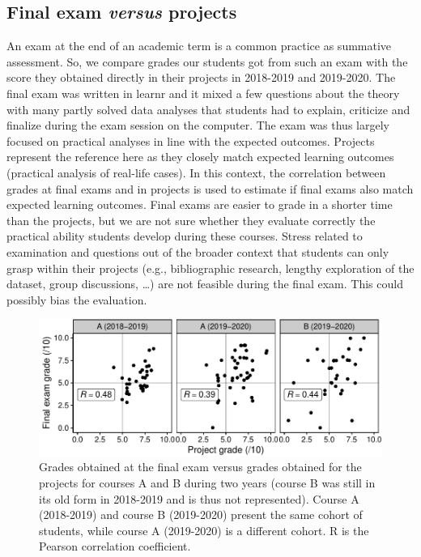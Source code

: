 \documentclass{aims}
\theoremstyle{definition}
\begin{document}
\hypertarget{final-exam-versus-projects-1}{%
\subsection{\texorpdfstring{Final exam \emph{versus}
projects}{Final exam versus projects}}\label{final-exam-versus-projects-1}}

An exam at the end of an academic term is a common practice as summative
assessment. So, we compare grades our students got from such an exam
with the score they obtained directly in their projects in 2018-2019 and
2019-2020. The final exam was written in learnr and it mixed a few
questions about the theory with many partly solved data analyses that
students had to explain, criticize and finalize during the exam session
on the computer. The exam was thus largely focused on practical analyses
in line with the expected outcomes. Projects represent the reference
here as they closely match expected learning outcomes (practical
analysis of real-life cases). In this context, the correlation between
grades at final exams and in projects is used to estimate if final exams
also match expected learning outcomes. Final exams are easier to grade
in a shorter time than the projects, but we are not sure whether they
evaluate correctly the practical ability students develop during these
courses. Stress related to examination and questions out of the broader
context that students can only grasp within their projects (e.g.,
bibliographic research, lengthy exploration of the dataset, group
discussions, \ldots) are not feasible during the final exam. This could
possibly bias the evaluation.

\begin{figure}
\includegraphics[width=1\linewidth]{teaching_data_science_files/figure-latex/fig_exams_projects-1} \caption{\label{fig:fig_exams_projects}  Grades obtained at the final exam versus grades obtained for the projects for courses A and B during two years (course B was still in its old form in 2018-2019 and is thus not represented). Course A (2018-2019) and course B (2019-2020) present the same cohort of students, while course A (2019-2020) is a different cohort. R is the Pearson correlation coefficient.}\label{fig:fig_exams_projects}
\end{figure}
\end{document}
